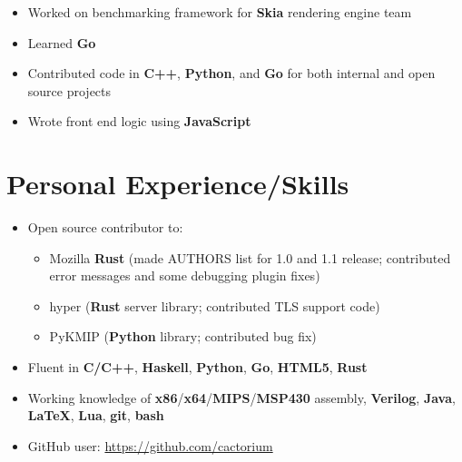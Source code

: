\documentclass{my_resume}
\begin{document}
\begin{itemize}
    \itemsep0em
	\item Worked on benchmarking framework for \textbf{Skia} rendering engine team
	\item Learned \textbf{Go}
	\item Contributed code in \textbf{C++}, \textbf{Python}, and \textbf{Go} for
		both internal and open source projects
	\item Wrote front end logic using \textbf{JavaScript}
\end{itemize}
\section{Personal Experience/Skills}
\begin{itemize}
    \itemsep0em
	\item Open source contributor to:
	\begin{itemize}
        \itemsep0em
		\item Mozilla \textbf{Rust} (made AUTHORS list for 1.0 and 1.1 release;
			contributed error messages and some debugging plugin fixes)
		\item hyper (\textbf{Rust} server library; contributed TLS support code)
		\item PyKMIP (\textbf{Python} library; contributed bug fix)
	\end{itemize}
	\item Fluent in \textbf{C/C++}, \textbf{Haskell}, \textbf{Python},
		\textbf{Go}, \textbf{HTML5}, \textbf{Rust}
	\item Working knowledge of \textbf{x86}/\textbf{x64}/\textbf{MIPS}/\textbf{MSP430} assembly,
		\textbf{Verilog}, \textbf{Java}, \textbf{LaTeX},
		\textbf{Lua}, \textbf{git}, \textbf{bash}
    \item GitHub user: \url{https://github.com/cactorium}
\end{itemize}
\end{document}
